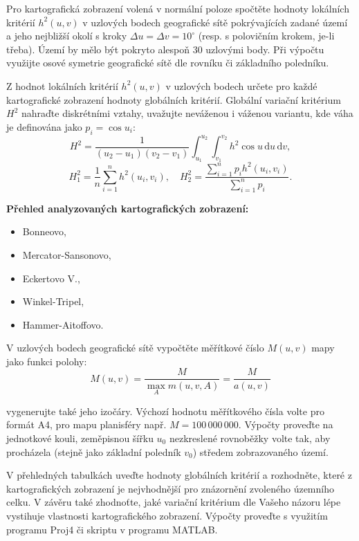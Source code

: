 \documentclass[12pt, a4paper]{article}
\begin{document}
\vspace{3mm}
\noindent Pro kartografická zobrazení volená v normální poloze spočtěte hodnoty lokálních kritérií $h^{2}(u,v)$ v uzlových bodech geografické sítě pokrývajících zadané území a jeho nejbližší okolí s kroky $\Delta u = \Delta v = 10^{\circ}$ (resp. s polovičním krokem, je-li třeba). Území by mělo být pokryto alespoň 30 uzlovými body. Při výpočtu využijte osové symetrie geografické sítě dle rovníku či základního poledníku.
\vspace{3mm}

\noindent Z hodnot lokálních kritérií $h^{2}(u,v)$ v uzlových bodech určete pro každé kartografické zobrazení hodnoty globálních kritérií. Globální variační kritérium $H^{2}$ nahraďte diskrétními vztahy, uvažujte neváženou i váženou variantu, kde váha je definována jako $p_{i} = \cos u_{i}$:
\[
H^{2} = \frac{1}{(u_{2}-u_{1})(v_{2}-v_{1})} \int_{u_{1}}^{u_{2}} \int_{v_{1}}^{v_{2}} h^{2} \cos u \, \mathrm{d}u \, \mathrm{d}v,
\]
\[
H_{1}^{2} = \frac{1}{n} \sum_{i=1}^{n} h^{2}(u_{i},v_{i}), \quad H_{2}^{2} = \frac{\sum_{i=1}^{n} p_{i} h^{2}(u_{i},v_{i})}{\sum_{i=1}^{n} p_{i}}.
\]

\vspace{3mm}
\noindent \textbf{Přehled analyzovaných kartografických zobrazení:}
\begin{itemize}
    \item Bonneovo,
    \item Mercator-Sansonovo,
    \item Eckertovo V.,
    \item Winkel-Tripel,
    \item Hammer-Aitoffovo.
\end{itemize}

\vspace{3mm}
\noindent V uzlových bodech geografické sítě vypočtěte měřítkové číslo $M(u,v)$ mapy jako funkci polohy:
\[
M(u,v) = \frac{M}{\max_{A} m(u,v,A)} = \frac{M}{a(u,v)}
\]

\noindent vygenerujte také jeho izočáry. Výchozí hodnotu měřítkového čísla volte pro formát A4, pro mapu planisféry např. $M = 100\,000\,000$. Výpočty proveďte na jednotkové kouli, zeměpisnou šířku $u_{0}$ nezkreslené rovnoběžky volte tak, aby procházela (stejně jako základní poledník $v_{0}$) středem zobrazovaného území.
\vspace{3mm}

\noindent V přehledných tabulkách uveďte hodnoty globálních kritérií a rozhodněte, které z kartografických zobrazení je nejvhodnější pro znázornění zvoleného územního celku. V závěru také zhodnoťte, jaké variační kritérium dle Vašeho názoru lépe vystihuje vlastnosti kartografického zobrazení. Výpočty proveďte s využitím programu Proj4 či skriptu v programu MATLAB.
\end{document}
